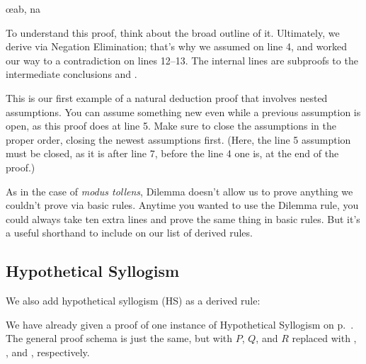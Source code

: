 \begin{ndproof}
	\open
		\open
			\metaA{}
		\close
		\open
			\metaB{}
		\close
		\metaB{}\oe{ab, na}
	\close
	 
\end{ndproof}

To understand this proof, think about the broad outline of it. Ultimately, we derive \metaC{} via Negation Elimination; that's why we assumed \enot\metaC{} on line 4, and worked our way to a contradiction on lines 12--13. The internal lines are subproofs to the intermediate conclusions \metaB{} and \enot\metaB{}. 

This is our first example of a natural deduction proof that involves nested assumptions. You can assume something new even while a previous assumption is open, as this proof does at line 5. Make sure to close the assumptions in the proper order, closing the newest assumptions first. (Here, the line 5 assumption must be closed, as it is after line 7, before the line 4 one is, at the end of the proof.)

As in the case of \emph{modus tollens}, Dilemma doesn't allow us to prove anything we couldn't prove via basic rules. Anytime you wanted to use the Dilemma rule, you could always take ten extra lines and prove the same thing in basic rules. But it's a useful shorthand to include on our list of derived rules.

\subsection{Hypothetical Syllogism}



We also add hypothetical syllogism (HS) as a derived rule:

\begin{ndproof}
\end{ndproof}

We have already given a proof of one instance of Hypothetical Syllogism on p.~\pageref{HSproof}. The general proof schema is just the same, but with $P$, $Q$, and $R$ replaced with \metaA{}, \metaB{}, and \metaC{}, respectively.





